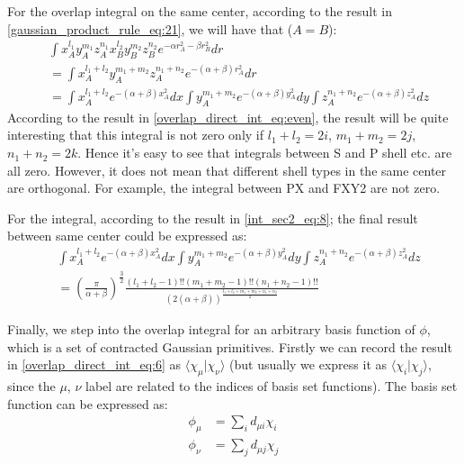 For the overlap integral on the same center, according to the result in 
\ref{gaussian_product_rule_eq:21}, we will have that ($A=B$):
\begin{equation}
 \begin{split}
&\int x_{A}^{l_{1}}y_{A}^{m_{1}}z_{A}^{n_{1}}
        x_{B}^{l_{2}}y_{B}^{m_{2}}z_{B}^{n_{2}}
        e^{-\alpha r_{A}^{2} - \beta r_{B}^{2}} dr \\
&= \int x_{A}^{l_{1}+l_{2}}y_{A}^{m_{1}+m_{2}}z_{A}^{n_{1}+n_{2}}e^{-(\alpha+\beta)r_{A}^{2}} dr\\
&= 
\int x_{A}^{l_{1}+l_{2}}e^{-(\alpha+\beta)x_{A}^{2}} dx
\int y_{A}^{m_{1}+m_{2}}e^{-(\alpha+\beta)y_{A}^{2}} dy
\int z_{A}^{n_{1}+n_{2}}e^{-(\alpha+\beta)z_{A}^{2}} dz
 \end{split}
\label{overlap_direct_int_eq:9}
\end{equation}
According to the result in \ref{overlap_direct_int_eq:even}, the result will 
be quite interesting that
this integral is not zero only if $l_{1}+l_{2} = 2i$, $m_{1}+m_{2} = 2j$, $n_{1}+n_{2} = 2k$. 
Hence it's easy to see that integrals between S and P shell etc. are all zero. However, it does 
not mean that different shell types in the same center are orthogonal. For example, the integral
between PX and FXY2 are not zero.

For the integral, according to the result in \ref{int_sec2_eq:8}; the final result 
between same center could be expressed as:
\begin{equation}
 \label{overlap_direct_int_eq:10}
\begin{split}
 & 
\int x_{A}^{l_{1}+l_{2}}e^{-(\alpha+\beta)x_{A}^{2}} dx
\int y_{A}^{m_{1}+m_{2}}e^{-(\alpha+\beta)y_{A}^{2}} dy
\int z_{A}^{n_{1}+n_{2}}e^{-(\alpha+\beta)z_{A}^{2}} dz \\
&= \left( \frac{\pi}{\alpha+\beta}\right)^{\frac{3}{2}} 
\frac{(l_{1}+l_{2}-1)!!(m_{1}+m_{2}-1)!!(n_{1}+n_{2}-1)!!}
{(2(\alpha+\beta))^{\frac{l_{1}+l_{2}+m_{1}+m_{2}+n_{1}+n_{2}}{2}}}
\end{split}
\end{equation}
 
Finally, we step into the overlap integral for an arbitrary basis function of $\phi$, which is 
a set of contracted Gaussian primitives. Firstly we can record the result in 
\ref{overlap_direct_int_eq:6}
as $\langle\chi_{\mu}|\chi_{\nu}\rangle$ (but usually we express it as 
$\langle\chi_{i}|\chi_{j}\rangle$, since the $\mu$, $\nu$ label are related to the indices of 
basis set functions). The basis set function can be expressed as:
\begin{equation}
\begin{split}
\label{overlap_direct_int_eq:11}
 \phi_{\mu} &= \sum_{i}d_{\mu i}\chi_{i} \\
 \phi_{\nu} &= \sum_{j}d_{\mu j}\chi_{j} 
\end{split}
\end{equation}

